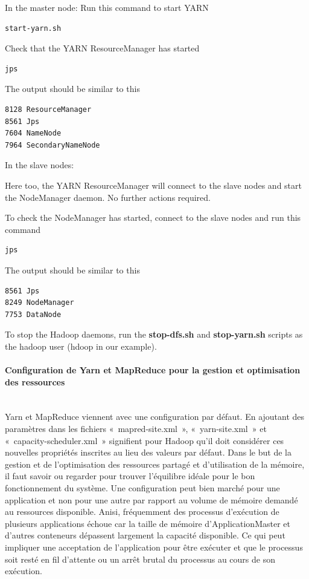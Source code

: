\documentclass[12pt,english]{book}
\begin{document}
In the master node:
Run this command to start YARN
\begin{lstlisting}[language=bash, frame=single]
start-yarn.sh
\end{lstlisting}

Check that the YARN ResourceManager has started
\begin{lstlisting}[language=bash, frame=single]
jps
\end{lstlisting}
The output should be similar to this
\begin{lstlisting}[language=bash, frame=single]
8128 ResourceManager
8561 Jps
7604 NameNode
7964 SecondaryNameNode
\end{lstlisting}

In the slave nodes:

Here too, the YARN ResourceManager will connect to the slave nodes and start the NodeManager daemon.
No further actions required.

To check the NodeManager has started, connect to the slave nodes and run this command
\begin{lstlisting}[language=bash, frame=single]
jps
\end{lstlisting}
The output should be similar to this
\begin{lstlisting}[language=bash, frame=single]
8561 Jps
8249 NodeManager
7753 DataNode
\end{lstlisting}

To stop the Hadoop daemons, run the \textbf{stop-dfs.sh} and \textbf{stop-yarn.sh} scripts as the hadoop user (hdoop in our example).


\paragraph{Configuration de Yarn et MapReduce pour la gestion et optimisation des ressources}\mbox{}\\


Yarn et MapReduce viennent avec une configuration par défaut. 
En ajoutant des paramètres dans les fichiers « mapred-site.xml », « yarn-site.xml » et « capacity-scheduler.xml » signifient pour Hadoop qu’il doit considérer ces nouvelles propriétés inscrites au lieu des valeurs par défaut.
Dans le but de la gestion et de l’optimisation des ressources partagé et d’utilisation de la mémoire, il faut savoir ou regarder pour trouver l’équilibre idéale pour le bon fonctionnement du système.
Une configuration peut bien marché pour une application et non pour une autre par rapport au volume de mémoire demandé au ressources disponible.
Anisi, fréquemment des processus d'exécution de plusieurs applications échoue car la taille de mémoire d'ApplicationMaster et d'autres conteneurs dépassent largement la capacité disponible.
Ce qui peut impliquer une acceptation de l’application pour être exécuter et que le processus soit resté en fil d’attente ou un arrêt brutal du processus au cours de son exécution.
\end{document}
